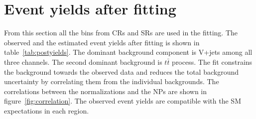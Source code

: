 \section{Event yields after fitting}
\label{sec:eventyields}
From this section all the bins from CRs and SRs are used in the fitting.
The observed and the estimated event yields after fitting is shown in table~\ref{tab:postyields}.
The dominant background component is V+jets among all three channels. 
The second dominant background is $t\bar{t}$ process. 
The fit constrains the background towards the observed data and reduces the total background uncertainty by correlating them from the individual backgrounds.
The correlations between the normalizations and the NPs are shown in figure~\ref{fig:correlation}.
The observed event yields are compatible with the SM expectations in each region.
